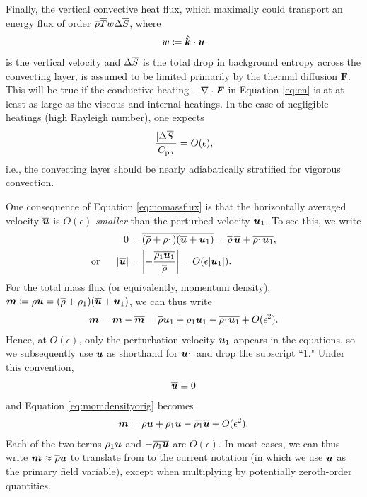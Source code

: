 \documentclass[12pt]{article}
\newcommand{\vecf}{\bm{F}}
\newcommand{\veck}{\hat{\bm{k}}}
\newcommand{\uover}{\overline{\vecu}}
\newcommand{\cpa}{C_{{\rm p}a}}
\begin{document}
	Finally, the vertical convective heat flux, which maximally could transport an energy flux of order $\overline{\rho} \overline{T} w \Delta\overline{S}$, where 
	\begin{align}\label{eq:defw}
		w\define\veck\cdot\vecu
	\end{align} is the vertical velocity and $\Delta \overline{S} $ is the total drop in background entropy across the convecting layer, is assumed to be limited primarily by the thermal diffusion $\vecf$. This will be true if the conductive heating $-\Div \vecf$ in Equation \eqref{eq:en} is at at least as large as the viscous and internal heatings. In the case of negligible heatings (high Rayleigh number), one expects
	\begin{align}
		\frac{|\Delta\entrover|}{\cpa} = O(\epsilon),
	\end{align}
	i.e., the convecting layer should be nearly adiabatically stratified for vigorous convection. 
	
	One consequence of Equation \eqref{eq:nomassflux} is that the horizontally averaged velocity $\overline{\bm{u}}$ is $O(\epsilon)$ \textit{smaller} than the perturbed velocity $\bm{u}_1$. To see this, we write
	\begin{align}
		0 &= \overline{(\rhoover+\rhoone)(\overline{\vecu}+\vecu_1)} = \rhoover\,\uover + \overline{\rhoone\vecu_1},\nonumber\\
		\orr |\uover| &= \left|-\frac{\overline{\rhoone\vecu_1}}{\rhoover}\right| = O(\epsilon|\vecu_1|).
	\end{align}
	For the total mass flux (or equivalently, momentum density), $\bm{m}\coloneqq \rho\bm{u}=(\overline{\rho}+\rho_1)(\overline{\bm{u}}+\bm{u}_1)$, we can thus write
		\begin{align}\label{eq:momdensityorig}
		\bm{m} = \bm{m}-\overline{\bm{m}}=\overline{\rho}\bm{u}_1 + \rho_1\bm{u}_1 - \overline{\rho_1\bm{u}_1} + O(\epsilon^2).
	\end{align}
	Hence, at $O(\epsilon)$, only the perturbation velocity $\bm{u}_1$ appears in the equations, so we subsequently use $\bm{u}$ as shorthand for $\bm{u}_1$ and drop the subscript ``1." Under this convention,
\begin{align}\label{eq:nomeanu}
	\overline{\bm{u}}\equiv0
\end{align}
	and Equation \eqref{eq:momdensityorig} becomes
	\begin{align}\label{eq:momdensity}
		\bm{m} = \overline{\rho}\bm{u} + \rho_1\bm{u} - \overline{\rho_1\bm{u}} + O(\epsilon^2).
	\end{align}
	Each of the two terms $\rho_1\bm{u}$ and $-\overline{\rho_1\bm{u}}$ are $O(\epsilon)$. In most cases, we can thus write $\bm{m} \approx \overline{\rho} \bm{u}$ to translate from \citet{Gough1969} to the current notation (in which we use $\bm{u}$ as the primary field variable), except when multiplying by potentially zeroth-order quantities.
	
\end{document}
